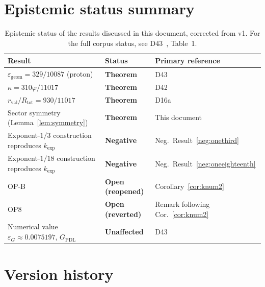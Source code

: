 \documentclass[12pt,a4paper]{article}
\theoremstyle{plain}
\theoremstyle{definition}
\theoremstyle{remark}
\newcommand{\vp}{\varphi}
\newcommand{\kap}{\kappa}
\newcommand{\rval}{r_{\mathrm{val}}}
\newcommand{\Rtot}{R_{\mathrm{tot}}}
\newcommand{\egeom}{\varepsilon_{\mathrm{geom}}}
\newcommand{\eG}{\varepsilon_G}
\begin{document}
\section{Epistemic status summary}
\label{sec:epistemic}

\begin{table}[H]
\centering
\caption{Epistemic status of the results discussed in this document, corrected from v1. For the full corpus status, see D43~\citep{D43}, Table~1.}
\label{tab:epistemic}
\medskip
\begin{tabular}{>{\raggedright}p{7.5cm} p{2.2cm} p{4.5cm}}
\toprule
Result & Status & Primary reference \\
\midrule
$\egeom=329/10087$ (proton) & \textcolor{proofblue}{\textbf{Theorem}} & D43~\citep{D43} \\[2pt]
$\kap=310\vp/11017$ & \textcolor{proofblue}{\textbf{Theorem}} & D42~\citep{D42} \\[2pt]
$\rval/\Rtot=930/11017$ & \textcolor{proofblue}{\textbf{Theorem}} & D16a~\citep{D16a} \\[2pt]
Sector symmetry (Lemma~\ref{lem:symmetry}) & \textcolor{proofblue}{\textbf{Theorem}} & This document \\[2pt]
Exponent-$1/3$ construction reproduces $k_{\exp}$ & \textcolor{negativered}{\textbf{Negative}} & Neg.\ Result~\ref{neg:onethird} \\[2pt]
Exponent-$1/18$ construction reproduces $k_{\exp}$ & \textcolor{negativered}{\textbf{Negative}} & Neg.\ Result~\ref{neg:oneeighteenth} \\[2pt]
OP-B & \textcolor{openproblemred}{\textbf{Open (reopened)}} & Corollary~\ref{cor:knum2} \\[2pt]
OP8 & \textcolor{openproblemred}{\textbf{Open (reverted)}} & Remark following Cor.~\ref{cor:knum2} \\[2pt]
Numerical value $\eG\approx0.0075197$, $G_{\mathrm{PDL}}$ & \textcolor{proofblue}{\textbf{Unaffected}} & D43~\citep{D43} \\[2pt]
\bottomrule
\end{tabular}
\end{table}

\appendix
\section{Version history}
\label{app:versions}
\end{document}
